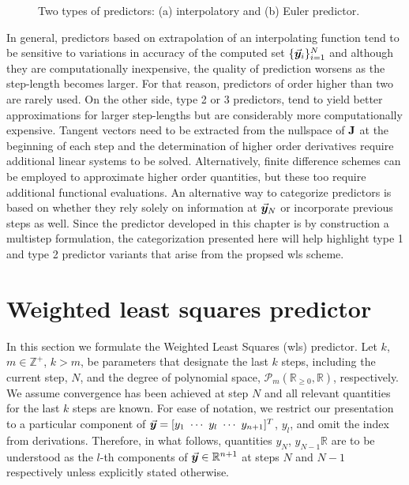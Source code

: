 \begin{figure*}[t]
	\centering
	\qquad
	\caption{Two types of predictors: (a) interpolatory and (b) Euler
		predictor.}%
	\label{fig:FIG42}%
\end{figure*}

In general, predictors based on extrapolation of an
interpolating function tend to be sensitive to variations in accuracy of the 
computed set
$\{\vec{\bm{y}}_i\}_{i=1}^N$ and although they are computationally inexpensive, the 
quality of prediction worsens as the 
step-length becomes
larger. For that reason, predictors of order higher than two are rarely
used\cite{Seydel87,Salgovic81}. On the other side, type 2 or 3
predictors\cite{Schwetlick87,Gervais04,Syam02,Syam03,Watson87,Deuflhard87,Lundberg93},
 tend to yield better approximations for larger step-lengths but are 
considerably more computationally expensive. Tangent vectors need to be
extracted from the nullspace of $\mathbf{J}$ at the beginning of each step and
the determination of higher order derivatives require additional linear systems
to be solved. Alternatively, finite difference schemes can be employed to
approximate higher order quantities, but these too require additional functional
evaluations. An alternative way to categorize predictors is based on whether
they rely solely on information at $\vec{\bm{y}}_N$ or incorporate previous steps as
well\cite{Allgower91}. Since the predictor developed in this chapter is by 
construction a multistep formulation, the categorization
presented here will help highlight type 1 and type 2 predictor variants that
arise from the propsed \acrshort{wls} scheme.



\section{Weighted least squares predictor}\label{CH5-S2}

In this section we formulate the Weighted Least Squares (\acrshort{wls}) 
predictor. Let $k$, $m\in\mathbb{Z}^+$, $k>m$, be parameters that designate the 
last $k$ 
steps, including the current step, $N$, and the degree of polynomial space,
$\mathcal{P}_m(\mathbb{R}_{\geq0},\mathbb{R})$,
respectively.
We assume convergence has been achieved at step $N$ and all
relevant quantities for the last $k$ steps are known. 
 For ease of notation, we restrict our presentation to a particular
component of $\bvec{y}=[ y_1\ \cdots\ y_l\ \cdots\  y_{n+1}]^T$, $y_l$, and 
omit 
the index from derivations.  Therefore, in what follows, quantities
$y_N$, $y_{N-1}\mathbb{R}$
are to be understood as the $l$-th components of $\vec{\bm{y}}\in\mathbb{R}^{n+1}$ 
at steps $N$ and $N-1$ respectively unless explicitly stated otherwise. 

